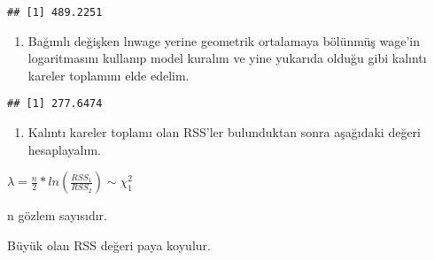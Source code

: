 \documentclass[
]{book}
\newenvironment{Shaded}{\begin{snugshade}}{\end{snugshade}}
\newcommand{\CommentTok}[1]{\textcolor[rgb]{0.56,0.35,0.01}{\textit{#1}}}
\newcommand{\DataTypeTok}[1]{\textcolor[rgb]{0.13,0.29,0.53}{#1}}
\newcommand{\DecValTok}[1]{\textcolor[rgb]{0.00,0.00,0.81}{#1}}
\newcommand{\KeywordTok}[1]{\textcolor[rgb]{0.13,0.29,0.53}{\textbf{#1}}}
\newcommand{\NormalTok}[1]{#1}
\newcommand{\OperatorTok}[1]{\textcolor[rgb]{0.81,0.36,0.00}{\textbf{#1}}}
\newcommand{\StringTok}[1]{\textcolor[rgb]{0.31,0.60,0.02}{#1}}
\providecommand{\tightlist}{%
  \setlength{\itemsep}{0pt}\setlength{\parskip}{0pt}}
\begin{document}
\begin{Shaded}
\end{Shaded}

\begin{verbatim}
## [1] 489.2251
\end{verbatim}

\begin{enumerate}
\def\labelenumi{\roman{enumi}.}
\setcounter{enumi}{3}
\tightlist
\item
  Bağımlı değişken lnwage yerine geometrik ortalamaya bölünmüş wage'in logaritmasını kullanıp model kuralım ve yine yukarıda olduğu gibi kalıntı kareler toplamını elde edelim.
\end{enumerate}

\begin{Shaded}
\end{Shaded}

\begin{verbatim}
## [1] 277.6474
\end{verbatim}

\begin{enumerate}
\def\labelenumi{\alph{enumi}.}
\setcounter{enumi}{21}
\tightlist
\item
  Kalıntı kareler toplamı olan RSS'ler bulunduktan sonra aşağıdaki değeri hesaplayalım.
\end{enumerate}

\(λ = \frac{n}{2} * ln(\frac{RSS_1}{RSS_2})\sim\chi^2_1\)

n gözlem sayısıdır.

Büyük olan RSS değeri paya koyulur.
\end{document}
